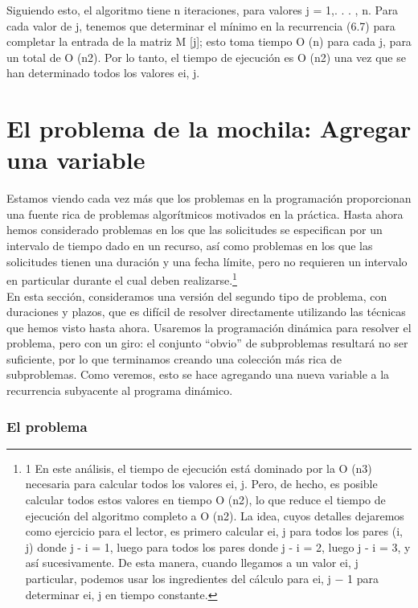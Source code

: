 \documentclass[a4paper, 12pt]{book}
\theoremstyle{dotless}
\begin{document}
Siguiendo esto, el algoritmo tiene n iteraciones, para valores j = 1,. . . , n. Para cada valor de j, tenemos que determinar el mínimo en la recurrencia (6.7) para completar la entrada de la matriz M [j]; esto toma tiempo O (n) para cada j, para un total de O (n2). Por lo tanto, el tiempo de ejecución es O (n2) una vez que se han determinado todos los valores ei, j.\\

\section{El problema de la mochila: Agregar una variable}

Estamos viendo cada vez más que los problemas en la programación proporcionan una fuente rica de problemas algorítmicos motivados en la práctica. Hasta ahora hemos considerado problemas en los que las solicitudes se especifican por un intervalo de tiempo dado en un recurso, así como problemas en los que las solicitudes tienen una duración y una fecha límite, pero no requieren un intervalo en particular durante el cual deben realizarse.\footnote{1 En este análisis, el tiempo de ejecución está dominado por la O (n3) necesaria para calcular todos los valores ei, j. Pero, de hecho, es posible calcular todos estos valores en tiempo O (n2), lo que reduce el tiempo de ejecución del algoritmo completo a O (n2). La idea, cuyos detalles dejaremos como ejercicio para el lector, es primero calcular ei, j para todos los pares (i, j) donde j - i = 1, luego para todos los pares donde j - i = 2, luego j - i = 3, y así sucesivamente. De esta manera, cuando llegamos a un valor ei, j particular, podemos usar los ingredientes del cálculo
para ei, j − 1 para determinar ei, j en tiempo constante.}\\

En esta sección, consideramos una versión del segundo tipo de problema, con duraciones y plazos, que es difícil de resolver directamente utilizando las técnicas que hemos visto hasta ahora. Usaremos la programación dinámica para resolver el problema, pero con un giro: el conjunto ``obvio'' de subproblemas resultará no ser suficiente, por lo que terminamos creando una colección más rica de subproblemas. Como veremos, esto se hace agregando una nueva variable a la recurrencia subyacente al programa dinámico.\\

\subsubsection*{El problema}
\end{document}
